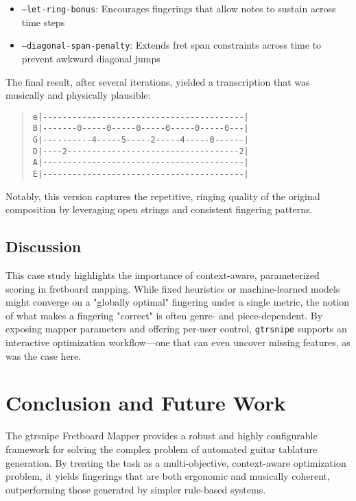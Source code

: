 \documentclass[conference]{IEEEtran}
\begin{document}
\begin{itemize}
  \item \texttt{--let-ring-bonus}: Encourages fingerings that allow notes to sustain across time steps
  \item \texttt{--diagonal-span-penalty}: Extends fret span constraints across time to prevent awkward diagonal jumps
\end{itemize}

The final result, after several iterations, yielded a transcription that was musically and physically plausible:

\begin{quote}\small
\begin{verbatim}
e|-----------------------------------------|
B|-------0-----0-----0-----0-----0-----0---|
G|----------4-----5-----2-----4-----0------|
D|----2-----------------------------------2|
A|-----------------------------------------|
E|-----------------------------------------|
\end{verbatim}
\end{quote}

Notably, this version captures the repetitive, ringing quality of the original composition by leveraging open strings and consistent fingering patterns.

\subsection{Discussion}

This case study highlights the importance of context-aware, parameterized scoring in fretboard mapping. While fixed heuristics or machine-learned models might converge on a "globally optimal" fingering under a single metric, the notion of what makes a fingering "correct" is often genre- and piece-dependent. By exposing mapper parameters and offering per-user control, \texttt{gtrsnipe} supports an interactive optimization workflow—one that can even uncover missing features, as was the case here.



\section{Conclusion and Future Work}

The gtrsnipe Fretboard Mapper provides a robust and highly configurable framework for solving the complex problem of automated guitar tablature generation. By treating the task as a multi-objective, context-aware optimization problem, it yields fingerings that are both ergonomic and musically coherent, outperforming those generated by simpler rule-based systems.
\end{document}
